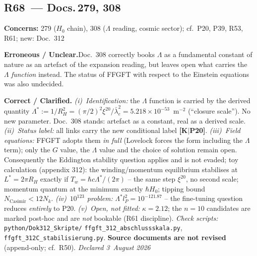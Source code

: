 \medskip

\subsection*{R68~--- Docs.\,279, 308}

\noindent\textbf{Concerns:} 279 ($H_0$ chain), 308 ($\Lambda$ reading,
cosmic sector); cf.\ P20, P39, R53, R61; new: Doc.~312

\smallskip\noindent\textbf{Erroneous / Unclear.}\quad Doc.~308 correctly
books $\Lambda$ as a fundamental constant of nature as an artefact of
the expansion reading, but leaves open what carries the $\Lambda$
\emph{function} instead. The status of FFGFT with respect to the
Einstein equations was also undecided.

\smallskip\noindent\textbf{Correct / Clarified.}\quad
\emph{(i)~Identification:} the $\Lambda$ function is carried by the
derived quantity $\Lambda^{*} := 1/R_H^2 = (\pi/2)^2\xi^{20}/
\bar\lambda_e^2 = 5.218\times10^{-53}$~m$^{-2}$ (\enquote{closure
scale}). No new parameter. Doc.~308 stands: artefact as a constant, real as
a derived scale. \emph{(ii)~Status label:} all links carry the new
conditional label \textbf{[K$|$P20]}. \emph{(iii)~Field equations:}
FFGFT adopts them \emph{in full} (Lovelock forces the form including the
$\Lambda$ term); only the $G$ value, the $\Lambda$ value and the choice
of solution remain open. Consequently the Eddington stability question
applies and is not evaded; toy calculation (appendix 312): the
winding/momentum equilibrium stabilises at $L^{*}=2\pi R_H$ exactly if
$T_w = \hbar c\Lambda^{*}/(2\pi)$ -- the same step $\xi^{20}$, no second
scale; momentum quantum at the minimum exactly $\hbar H_0$; tipping
bound $N_\text{Casimir} < 12N_k$. \emph{(iv)~$10^{123}$ problem:}
$\Lambda^{*}l_P^2 = 10^{-121.87}$ -- the fine-tuning question reduces
\emph{entirely} to P20. \emph{(v)~Open, not fitted:} $\kappa = 2.12$;
the $n{=}10$ candidates are marked post-hoc and are \emph{not} bookable
(R61 discipline). \emph{Check scripts:} \texttt{python/Dok312\_Skripte/}
\texttt{ffgft\_312\_abschlussskala.py}, \texttt{ffgft\_312C\_stabilisierung.py}.
\textbf{Source documents are not revised} (append-only; cf.\ R50).
\emph{Declared 3~August 2026}

